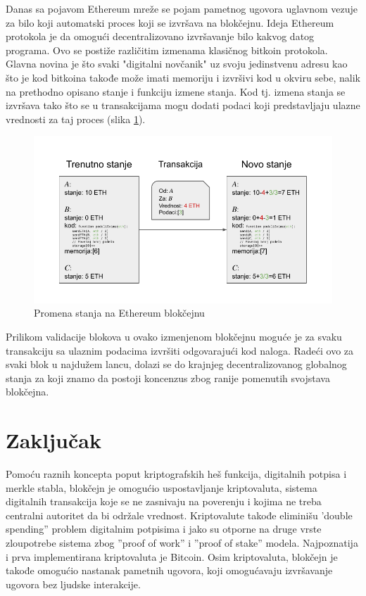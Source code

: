 \documentclass[a4paper]{article}
\begin{document}
{Danas sa pojavom Ethereum mreže se pojam pametnog ugovora uglavnom vezuje za bilo koji automatski proces koji se izvršava na blokčejnu.
Ideja Ethereum protokola je da omogući decentralizovano izvršavanje bilo kakvog datog programa. Ovo se postiže različitim izmenama klasičnog bitkoin protokola.
Glavna novina je što svaki "digitalni novčanik" uz svoju jedinstvenu adresu kao što je kod bitkoina takođe može imati memoriju i izvršivi kod u okviru sebe, nalik na prethodno opisano stanje i funkciju izmene stanja.
Kod tj. izmena stanja se izvršava tako što se u transakcijama mogu dodati podaci koji predstavljaju ulazne vrednosti za taj proces (slika \ref{fig:ethereum_state_transition}).

\begin{figure}[H]
    \centering
        \includegraphics[scale=0.8]{Ethereum_State_Transition.pdf}
    \caption{Promena stanja na Ethereum blokčejnu}
    \label{fig:ethereum_state_transition}
\end{figure}

Prilikom validacije blokova u ovako izmenjenom blokčejnu moguće je za svaku transakciju sa ulaznim podacima izvršiti odgovarajući kod naloga. Radeći ovo za svaki blok u najdužem lancu, dolazi se do krajnjeg decentralizovanog globalnog stanja za koji znamo da postoji koncenzus zbog ranije pomenutih svojstava blokčejna.



\section{Zaključak}
\label{sec:zakljucak}
Pomoću raznih koncepta poput kriptografskih heš funkcija, digitalnih potpisa i merkle stabla, blokčejn je omogućio uspostavljanje kriptovaluta, sistema digitalnih transakcija koje se ne zasnivaju na poverenju i kojima ne treba centralni autoritet da bi održale vrednost. Kriptovalute takođe eliminišu 'double spending'' problem digitalnim potpisima i jako su otporne na druge vrste zloupotrebe sistema zbog ''proof of work'' i ''proof of stake'' modela. Najpoznatija i prva implementirana kriptovaluta je Bitcoin. Osim kriptovaluta, blokčejn je takođe omogućio nastanak pametnih ugovora, koji omogućavaju izvršavanje ugovora bez ljudske interakcije.

}
\end{document}
